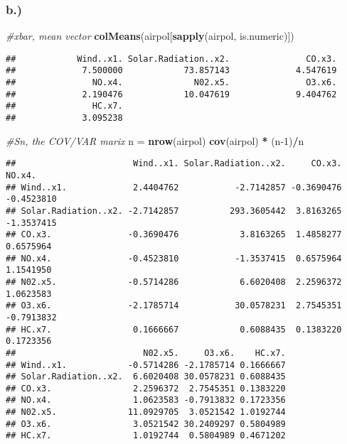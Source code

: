 \documentclass[
]{article}
\newenvironment{Shaded}{\begin{snugshade}}{\end{snugshade}}
\newcommand{\CommentTok}[1]{\textcolor[rgb]{0.56,0.35,0.01}{\textit{#1}}}
\newcommand{\DecValTok}[1]{\textcolor[rgb]{0.00,0.00,0.81}{#1}}
\newcommand{\KeywordTok}[1]{\textcolor[rgb]{0.13,0.29,0.53}{\textbf{#1}}}
\newcommand{\NormalTok}[1]{#1}
\newcommand{\OperatorTok}[1]{\textcolor[rgb]{0.81,0.36,0.00}{\textbf{#1}}}
\newcommand{\StringTok}[1]{\textcolor[rgb]{0.31,0.60,0.02}{#1}}
\begin{document}
\hypertarget{b.}{%
\subsubsection{b.)}\label{b.}}

\begin{Shaded}
\begin{Highlighting}[]
\CommentTok{#xbar, mean vector}
\KeywordTok{colMeans}\NormalTok{(airpol[}\KeywordTok{sapply}\NormalTok{(airpol, is.numeric)]) }
\end{Highlighting}
\end{Shaded}

\begin{verbatim}
##            Wind..x1. Solar.Radiation..x2.               CO.x3. 
##             7.500000            73.857143             4.547619 
##               NO.x4.              N02.x5.               O3.x6. 
##             2.190476            10.047619             9.404762 
##               HC.x7. 
##             3.095238
\end{verbatim}

\begin{Shaded}
\begin{Highlighting}[]
\CommentTok{#Sn, the COV/VAR marix}
\NormalTok{n =}\StringTok{ }\KeywordTok{nrow}\NormalTok{(airpol)}
\KeywordTok{cov}\NormalTok{(airpol) }\OperatorTok{*}\StringTok{ }\NormalTok{(n}\DecValTok{-1}\NormalTok{)}\OperatorTok{/}\NormalTok{n}
\end{Highlighting}
\end{Shaded}

\begin{verbatim}
##                       Wind..x1. Solar.Radiation..x2.     CO.x3.     NO.x4.
## Wind..x1.             2.4404762           -2.7142857 -0.3690476 -0.4523810
## Solar.Radiation..x2. -2.7142857          293.3605442  3.8163265 -1.3537415
## CO.x3.               -0.3690476            3.8163265  1.4858277  0.6575964
## NO.x4.               -0.4523810           -1.3537415  0.6575964  1.1541950
## N02.x5.              -0.5714286            6.6020408  2.2596372  1.0623583
## O3.x6.               -2.1785714           30.0578231  2.7545351 -0.7913832
## HC.x7.                0.1666667            0.6088435  0.1383220  0.1723356
##                         N02.x5.     O3.x6.    HC.x7.
## Wind..x1.            -0.5714286 -2.1785714 0.1666667
## Solar.Radiation..x2.  6.6020408 30.0578231 0.6088435
## CO.x3.                2.2596372  2.7545351 0.1383220
## NO.x4.                1.0623583 -0.7913832 0.1723356
## N02.x5.              11.0929705  3.0521542 1.0192744
## O3.x6.                3.0521542 30.2409297 0.5804989
## HC.x7.                1.0192744  0.5804989 0.4671202
\end{verbatim}
\end{document}
